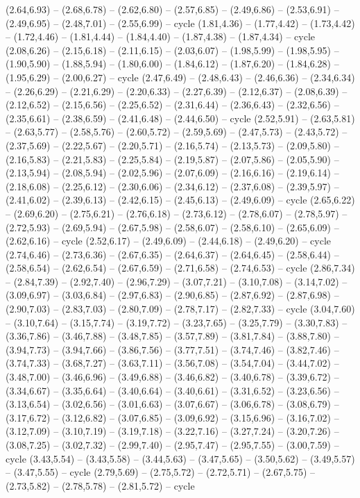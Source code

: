 {  (2.64,6.93) -- (2.68,6.78) -- (2.62,6.80) -- (2.57,6.85) -- (2.49,6.86) -- (2.53,6.91) -- (2.49,6.95) -- (2.48,7.01) -- (2.55,6.99) -- cycle
  (1.81,4.36) -- (1.77,4.42) -- (1.73,4.42) -- (1.72,4.46) -- (1.81,4.44) -- (1.84,4.40) -- (1.87,4.38) -- (1.87,4.34) -- cycle
  (2.08,6.26) -- (2.15,6.18) -- (2.11,6.15) -- (2.03,6.07) -- (1.98,5.99) -- (1.98,5.95) -- (1.90,5.90) -- (1.88,5.94) -- (1.80,6.00) -- (1.84,6.12) -- (1.87,6.20) -- (1.84,6.28) -- (1.95,6.29) -- (2.00,6.27) -- cycle
  (2.47,6.49) -- (2.48,6.43) -- (2.46,6.36) -- (2.34,6.34) -- (2.26,6.29) -- (2.21,6.29) -- (2.20,6.33) -- (2.27,6.39) -- (2.12,6.37) -- (2.08,6.39) -- (2.12,6.52) -- (2.15,6.56) -- (2.25,6.52) -- (2.31,6.44) -- (2.36,6.43) -- (2.32,6.56) -- (2.35,6.61) -- (2.38,6.59) -- (2.41,6.48) -- (2.44,6.50) -- cycle
  (2.52,5.91) -- (2.63,5.81) -- (2.63,5.77) -- (2.58,5.76) -- (2.60,5.72) -- (2.59,5.69) -- (2.47,5.73) -- (2.43,5.72) -- (2.37,5.69) -- (2.22,5.67) -- (2.20,5.71) -- (2.16,5.74) -- (2.13,5.73) -- (2.09,5.80) -- (2.16,5.83) -- (2.21,5.83) -- (2.25,5.84) -- (2.19,5.87) -- (2.07,5.86) -- (2.05,5.90) -- (2.13,5.94) -- (2.08,5.94) -- (2.02,5.96) -- (2.07,6.09) -- (2.16,6.16) -- (2.19,6.14) -- (2.18,6.08) -- (2.25,6.12) -- (2.30,6.06) -- (2.34,6.12) -- (2.37,6.08) -- (2.39,5.97) -- (2.41,6.02) -- (2.39,6.13) -- (2.42,6.15) -- (2.45,6.13) -- (2.49,6.09) -- cycle
  (2.65,6.22) -- (2.69,6.20) -- (2.75,6.21) -- (2.76,6.18) -- (2.73,6.12) -- (2.78,6.07) -- (2.78,5.97) -- (2.72,5.93) -- (2.69,5.94) -- (2.67,5.98) -- (2.58,6.07) -- (2.58,6.10) -- (2.65,6.09) -- (2.62,6.16) -- cycle
  (2.52,6.17) -- (2.49,6.09) -- (2.44,6.18) -- (2.49,6.20) -- cycle
  (2.74,6.46) -- (2.73,6.36) -- (2.67,6.35) -- (2.64,6.37) -- (2.64,6.45) -- (2.58,6.44) -- (2.58,6.54) -- (2.62,6.54) -- (2.67,6.59) -- (2.71,6.58) -- (2.74,6.53) -- cycle
  (2.86,7.34) -- (2.84,7.39) -- (2.92,7.40) -- (2.96,7.29) -- (3.07,7.21) -- (3.10,7.08) -- (3.14,7.02) -- (3.09,6.97) -- (3.03,6.84) -- (2.97,6.83) -- (2.90,6.85) -- (2.87,6.92) -- (2.87,6.98) -- (2.90,7.03) -- (2.83,7.03) -- (2.80,7.09) -- (2.78,7.17) -- (2.82,7.33) -- cycle
  (3.04,7.60) -- (3.10,7.64) -- (3.15,7.74) -- (3.19,7.72) -- (3.23,7.65) -- (3.25,7.79) -- (3.30,7.83) -- (3.36,7.86) -- (3.46,7.88) -- (3.48,7.85) -- (3.57,7.89) -- (3.81,7.84) -- (3.88,7.80) -- (3.94,7.73) -- (3.94,7.66) -- (3.86,7.56) -- (3.77,7.51) -- (3.74,7.46) -- (3.82,7.46) -- (3.74,7.33) -- (3.68,7.27) -- (3.63,7.11) -- (3.56,7.08) -- (3.54,7.04) -- (3.44,7.02) -- (3.48,7.00) -- (3.46,6.96) -- (3.49,6.88) -- (3.46,6.82) -- (3.40,6.78) -- (3.39,6.72) -- (3.34,6.67) -- (3.35,6.64) -- (3.40,6.64) -- (3.40,6.61) -- (3.31,6.52) -- (3.23,6.56) -- (3.13,6.54) -- (3.02,6.56) -- (3.01,6.63) -- (3.07,6.67) -- (3.06,6.78) -- (3.08,6.79) -- (3.17,6.72) -- (3.12,6.82) -- (3.07,6.85) -- (3.09,6.92) -- (3.15,6.96) -- (3.16,7.02) -- (3.12,7.09) -- (3.10,7.19) -- (3.19,7.18) -- (3.22,7.16) -- (3.27,7.24) -- (3.20,7.26) -- (3.08,7.25) -- (3.02,7.32) -- (2.99,7.40) -- (2.95,7.47) -- (2.95,7.55) -- (3.00,7.59) -- cycle
  (3.43,5.54) -- (3.43,5.58) -- (3.44,5.63) -- (3.47,5.65) -- (3.50,5.62) -- (3.49,5.57) -- (3.47,5.55) -- cycle
  (2.79,5.69) -- (2.75,5.72) -- (2.72,5.71) -- (2.67,5.75) -- (2.73,5.82) -- (2.78,5.78) -- (2.81,5.72) -- cycle}
